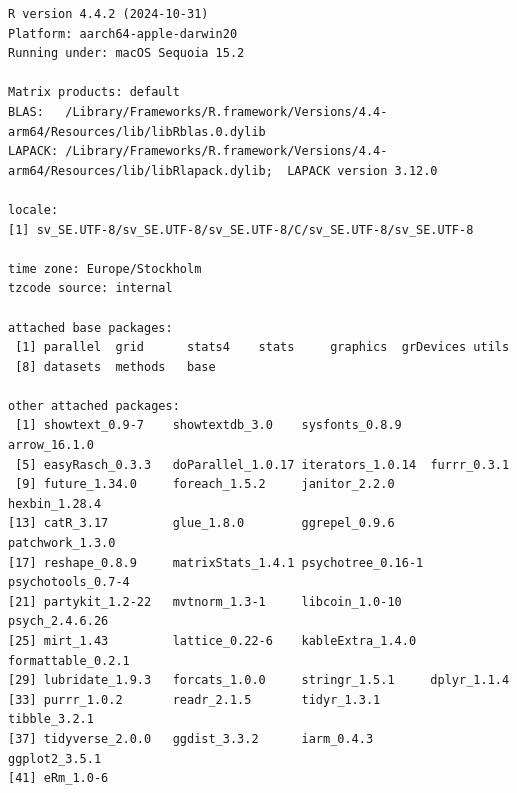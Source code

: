 \documentclass[
  letterpaper,
  DIV=11,
  numbers=noendperiod]{scrartcl}
\begin{document}
\begin{verbatim}
R version 4.4.2 (2024-10-31)
Platform: aarch64-apple-darwin20
Running under: macOS Sequoia 15.2

Matrix products: default
BLAS:   /Library/Frameworks/R.framework/Versions/4.4-arm64/Resources/lib/libRblas.0.dylib 
LAPACK: /Library/Frameworks/R.framework/Versions/4.4-arm64/Resources/lib/libRlapack.dylib;  LAPACK version 3.12.0

locale:
[1] sv_SE.UTF-8/sv_SE.UTF-8/sv_SE.UTF-8/C/sv_SE.UTF-8/sv_SE.UTF-8

time zone: Europe/Stockholm
tzcode source: internal

attached base packages:
 [1] parallel  grid      stats4    stats     graphics  grDevices utils    
 [8] datasets  methods   base     

other attached packages:
 [1] showtext_0.9-7    showtextdb_3.0    sysfonts_0.8.9    arrow_16.1.0     
 [5] easyRasch_0.3.3   doParallel_1.0.17 iterators_1.0.14  furrr_0.3.1      
 [9] future_1.34.0     foreach_1.5.2     janitor_2.2.0     hexbin_1.28.4    
[13] catR_3.17         glue_1.8.0        ggrepel_0.9.6     patchwork_1.3.0  
[17] reshape_0.8.9     matrixStats_1.4.1 psychotree_0.16-1 psychotools_0.7-4
[21] partykit_1.2-22   mvtnorm_1.3-1     libcoin_1.0-10    psych_2.4.6.26   
[25] mirt_1.43         lattice_0.22-6    kableExtra_1.4.0  formattable_0.2.1
[29] lubridate_1.9.3   forcats_1.0.0     stringr_1.5.1     dplyr_1.1.4      
[33] purrr_1.0.2       readr_2.1.5       tidyr_1.3.1       tibble_3.2.1     
[37] tidyverse_2.0.0   ggdist_3.3.2      iarm_0.4.3        ggplot2_3.5.1    
[41] eRm_1.0-6        


\end{verbatim}
\end{document}
